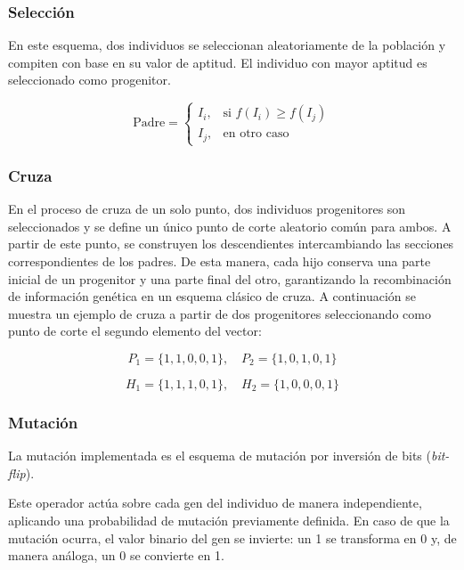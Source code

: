 \subsubsection{Selección}

En este esquema, dos individuos se seleccionan aleatoriamente de la población y compiten con base en su valor de aptitud. El individuo con mayor aptitud es seleccionado como progenitor.

\begin{equation}
	\text{Padre} = 
	\begin{cases}
		I_i, & \text{si } f(I_i) \geq f(I_j) \\
		I_j, & \text{en otro caso}
	\end{cases}
	\label{eq:EMN3}
\end{equation}

\subsubsection{Cruza}

En el proceso de cruza de un solo punto, dos individuos progenitores son seleccionados y se define un único punto de corte aleatorio común para ambos. A partir de este punto, se construyen los descendientes intercambiando las secciones correspondientes de los padres. De esta manera, cada hijo conserva una parte inicial de un progenitor y una parte final del otro, garantizando la recombinación de información genética en un esquema clásico de cruza. A continuación se muestra un ejemplo de cruza a partir de dos progenitores seleccionando como punto de corte el segundo elemento del vector:

\begin{equation}
	P_1 = \{1,1,0,0,1\}, \quad 
	P_2 = \{1,0,1,0,1\}
\end{equation}

\begin{equation}
	H_1 = \{1,1,1,0,1\}, \quad 
	H_2 = \{1,0,0,0,1\}
\end{equation}

\subsubsection{Mutación}

La mutación implementada es el esquema de mutación por inversión de bits (\textit{bit-flip}).

Este operador actúa sobre cada gen del individuo de manera independiente, aplicando una probabilidad de mutación previamente definida. En caso de que la mutación ocurra, el valor binario del gen se invierte: un 1 se transforma en 0 y, de manera análoga, un 0 se convierte en 1. 

